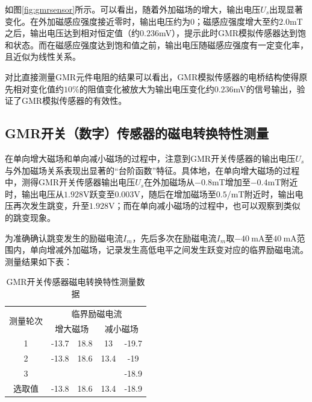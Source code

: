 \documentclass{thuemp}
\begin{document}
如图\ref{fig:gmrsensor}所示。可以看出，随着外加磁场的增大，输出电压$U_s$出现显著变化。在外加磁感应强度接近零时，输出电压约为0；磁感应强度增大至约$2.0$\si{\milli\tesla}之后，输出电压达到相对恒定值（约$0.236$\si{\milli\volt}），提示此时GMR模拟传感器达到饱和状态。而在磁感应强度达到饱和值之前，输出电压随磁感应强度有一定变化率，且近似为线性关系。

对比直接测量GMR元件电阻的结果可以看出，GMR模拟传感器的电桥结构使得原先相对变化值约$10\%$的阻值变化被放大为输出电压变化约$0.236$\si{\milli\volt}的信号输出，验证了GMR模拟传感器的有效性。

\subsection{GMR开关（数字）传感器的磁电转换特性测量}

在单向增大磁场和单向减小磁场的过程中，注意到GMR开关传感器的输出电压$U_s$与外加磁场关系表现出显著的“台阶函数”特征。具体地，在单向增大磁场的过程中，测得GMR开关传感器输出电压$U_s$在外加磁场从$-0.8$\si{\milli\tesla}增加至$-0.4$\si{\milli\tesla}附近时，输出电压从$1.928$\si{\volt}跃变至$0.003$\si{\volt}，随后在增加磁场至$0.5$/\si{\milli\tesla}附近时，输出电压再次发生跳变，升至$1.928$\si{\volt}；而在单向减小磁场的过程中，也可以观察到类似的跳变现象。

为准确确认跳变发生的励磁电流$I_m$，先后多次在励磁电流$I_m$取$-40 ~ \mathrm{mA}$至$40 ~ \mathrm{mA}$范围内，单向增减外加磁场，记录发生高低电平之间发生跃变对应的临界励磁电流。测量结果如下表：

\begin{table}[H]
    \centering
    \captionnamefont{\wuhao\bf\heiti}
    \captiontitlefont{\wuhao\bf\heiti}
    \caption{GMR开关传感器磁电转换特性测量数据} \label{tab:gmr_switch}
    \liuhao
        \begin{tabular}{ccccc}
        \toprule
        \multirow{2}{*}{测量轮次} & \multicolumn{4}{c}{临界励磁电流} $I_m$ /\si{\milli\ampere} \\
        &  \multicolumn{2}{c}{增大磁场} &  \multicolumn{2}{c}{减小磁场}\\
        \midrule
            1 & -13.7 & 18.8 & 13   & -19.7 \\
            2 & -13.8 & 18.6 & 13.4 & -19   \\
            3 &       &      &      & -18.9 \\
        选取值 & -13.8 & 18.6 & 13.4 & -18.9 \\
        \bottomrule
        \end{tabular}
\end{table}
\end{document}
